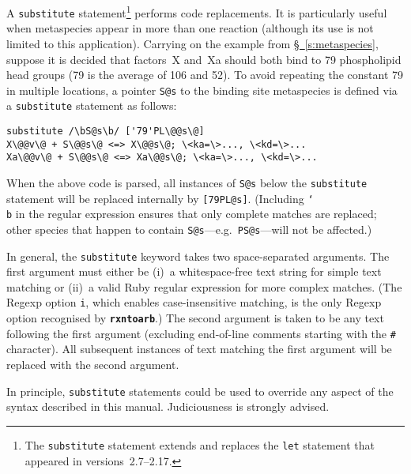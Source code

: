 \documentclass[fontsize=12pt,
               captions=abovetable,
               numbers=noenddot,
              ]{scrartcl}
\newcommand{\eg}[1][\ ]{e.g.#1}
\newcommand{\sect}[1]{\hyperref[s:#1]{\S~\ref{s:#1}}}
\newcommand{\rxntoarb}{\texttt{\textbf{rxntoarb}}}
\newcommand{\syntax}[2]{\textcolor{#1}{\texttt{#2}}}
\begin{document}
A \syntax{statement}{substitute} statement\footnote{The \syntax{statement}{substitute} statement extends and replaces the \syntax{statement}{let} statement that appeared in versions~2.7--2.17.} performs code replacements. It is particularly useful when metaspecies appear in more than one reaction (although its use is not limited to this application). Carrying on the example from \sect{metaspecies}, suppose it is decided that factors~X and~Xa should both bind to 79 phospholipid head groups (79 is the average of 106 and 52). To avoid repeating the constant 79 in multiple locations, a pointer \texttt{S}\syntax{special}{@s} to the binding site metaspecies is defined via a \syntax{statement}{substitute} statement as follows:
%
\begingroup
\let\thelstnumber\relax
\begin{lstlisting}
substitute /\bS@s\b/ ['79'PL\@@s\@]
X\@@v\@ + S\@@s\@ <=> X\@@s\@; \<ka=\>..., \<kd=\>...
Xa\@@v\@ + S\@@s\@ <=> Xa\@@s\@; \<ka=\>..., \<kd=\>...
\end{lstlisting}
\endgroup
%
\noindent{}When the above code is parsed, all instances of \texttt{S}\syntax{special}{@s} below the \syntax{statement}{substitute} statement will be replaced internally by \texttt{\syntax{statement}{[}\syntax{string}{79}PL\syntax{special}{@s}\syntax{statement}{]}}. (Including \syntax{special}{\char`\\b} in the regular expression ensures that only complete matches are replaced; other species that happen to contain \texttt{S}\syntax{special}{@s}---\eg[]~\texttt{PS}\syntax{special}{@s}---will not be affected.) 

In general, the \syntax{statement}{substitute} keyword takes two space-separated arguments. The first argument must either be (i)~a whitespace-free text string for simple text matching or (ii)~a valid Ruby regular expression for more complex matches. (The Regexp option \syntax{special}{i}, which enables case-insensitive matching, is the only Regexp option recognised by \rxntoarb.) The second argument is taken to be any text following the first argument (excluding end-of-line comments starting with the \syntax{comment}{\#} character). All subsequent instances of text matching the first argument will be replaced with the second argument.

In principle, \syntax{statement}{substitute} statements could be used to override any aspect of the syntax described in this manual. Judiciousness is strongly advised.


\end{document}
